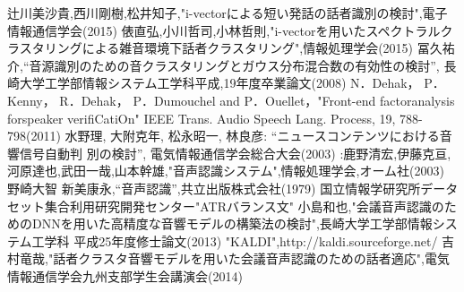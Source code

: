 \begin{thebibliography}{99}     %
辻川美沙貴,西川剛樹,松井知子,"i-vectorによる短い発話の話者識別の検討",電子情報通信学会(2015)
俵直弘,小川哲司,小林哲則,"i-vectorを用いたスペクトラルクラスタリングによる雑音環境下話者クラスタリング",情報処理学会(2015)
冨久祐介,“音源識別のための音クラスタリングとガウス分布混合数の有効性の検討”,
長崎大学工学部情報システム工学科平成,19年度卒業論文(2008)
N．Dehak， P．Kenny， R．Dehak， P．Dumouchel and P．Ouellet，"Front-end factoranalysis forspeaker verifiCatiOn" IEEE Trans. Audio Speech Lang. Process, 19, 788-798(2011)
水野理, 大附克年, 松永昭一, 林良彦: “ニュースコンテンツにおける音響信号自動判
別の検討”, 電気情報通信学会総合大会(2003)
:鹿野清宏,伊藤克亘,河原達也,武田一哉,山本幹雄,"音声認識システム",情報処理学会,オーム社(2003)
野崎大智
新美康永,“音声認識”,共立出版株式会社(1979)
国立情報学研究所データセット集合利用研究開発センター"ATRバランス文"
小島和也,"会議音声認識のためのDNNを用いた高精度な音響モデルの構築法の検討",長崎大学工学部情報システム工学科 平成25年度修士論文(2013)
"KALDI",http://kaldi.sourceforge.net/
吉村竜哉,"話者クラスタ音響モデルを用いた会議音声認識のための話者適応",電気情報通信学会九州支部学生会講演会(2014)
\end{thebibliography}
